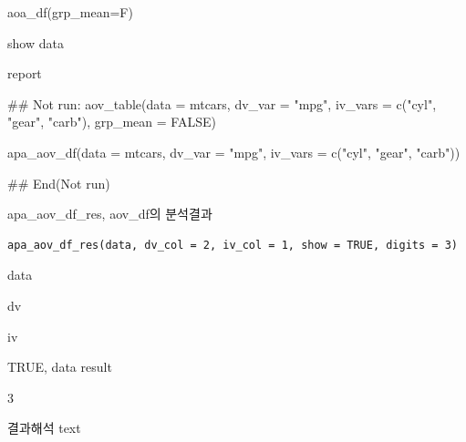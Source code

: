 \documentclass[a4paper]{book}
\begin{document}
%
\begin{Arguments}
\begin{ldescription}
\item[\code{data}] aoa\_df(grp\_mean=F)

\item[\code{show}] show data
\end{ldescription}
\end{Arguments}
%
\begin{Value}
report
\end{Value}
%
\begin{Examples}
\begin{ExampleCode}
\#\# Not run: 
aov_table(data = mtcars, dv_var = "mpg",
iv_vars = c("cyl", "gear", "carb"),
grp_mean = FALSE)%

apa_aov_df(data = mtcars, dv_var = "mpg",
 iv_vars = c("cyl", "gear", "carb"))

## End(Not run)


\end{ExampleCode}
\end{Examples}
%
\begin{Description}
apa\_aov\_df\_res, aov\_df의 분석결과
\end{Description}
%
\begin{Usage}
\begin{verbatim}
apa_aov_df_res(data, dv_col = 2, iv_col = 1, show = TRUE, digits = 3)
\end{verbatim}
\end{Usage}
%
\begin{Arguments}
\begin{ldescription}
\item[\code{data}] data

\item[\code{dv\_col}] dv

\item[\code{iv\_col}] iv

\item[\code{show}] TRUE, data result

\item[\code{digits}] 3
\end{ldescription}
\end{Arguments}
%
\begin{Value}
결과해석 text
\end{Value}
%
\end{document}
